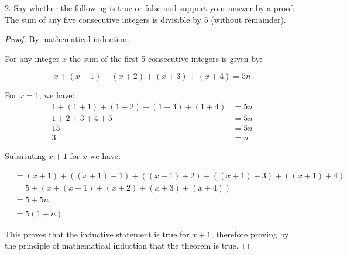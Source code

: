 \documentclass[a4paper,12pt]{article}
\begin{document}
2. Say whether the following is true or false and support your answer by a proof: 
The sum of any five consecutive integers is divisible by 5 (without remainder).

\begin{proof}

  By mathematical induction.

  For any integer $x$ the sum of the first 5 consecutive integers is given by:

  $$x + (x + 1) + (x + 2) + (x + 3) + (x + 4) = 5n $$

  For $x = 1$, we have:
\begin{align*} 
  1 + (1 + 1) + (1 + 2) + (1 + 3) + (1 + 4) &= 5n \\
  1 + 2 + 3 + 4 + 5 &= 5n \\
  15 &= 5n \\
  3 &= n
\end{align*}

Subsituting $x + 1$ for $x$ we have:

\begin{align*} 
&= (x + 1) + ((x + 1) + 1) + ((x + 1) + 2) + ((x + 1) + 3) + ((x + 1) + 4) 
  \tag{subsitute x+1} \\
&= 5 + (x + (x + 1) + (x + 2) + (x + 3) + (x + 4)) 
  \tag{bring plus ones out the front} \\
&= 5 + 5n \\ \tag{from the inductive statement} \\
&= 5(1 + n)
\end{align*}

This proves that the inductive statement is true for $x + 1$, therefore proving
by the principle of mathematical induction that the theorem is true.
  
\end{proof}
\end{document}
